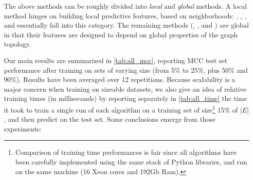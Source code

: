 The above methods can be roughly divided into \emph{local} and \emph{global} methods. A local method
hinges on building local predictive features, based on neighborhoods: \usrule{}, \uslogregp{},
\comptriads{}, and \compbayesian{} essentially fall into this category. The remaining methods
(\uslpropGsec{}, \complowrank{}, \compmaxnorm{} and \compranknodes{}) are global in that their
features are
designed to depend on global properties of the graph topology.

\iffalse
First, with label propagation (referred to as \uslprop{} in the following). We
initialize the labels vector $f_0$ to $|V'|$ random values drawn uniformly in
$[0, 1]$ and set the label of the training edges equal to their observed value.
Let the adjacency matrix of $G'$ be $A$, its diagonal degree matrix
be $D$, its diameter be $\diam{G'}$ and $P$ be the following sparse matrix $P=D^{-1}A$. This allow performing
one round of label propagation as $f_{t+1} = Pf_t$, followed by clamping the
training labels. Each round thus involves $2|E|$ multiplications and we do
$\diam{G'}$ of them\footnote{$\diam{G'}$ is a small constant, ranging from $16$
for \aut{} to $38$ for \epi{}}. With the computed labels, we can associate each
edge $\eij$ with $a_{i,j} = \nicefrac{1}{2}\left(f_{\diam{G'}}(\iout) +
f_{\diam{G'}}(\jin)\right)$.
By sorting the $a$ values of the training edges, we can find the threshold $t$
that minimizes the number of mistakes on the training set while predicting
$\yij = \sgn\left(a_{i,j} - t\right)$ in $O(|\trainset{}|\log |\trainset{}|)$
time.

Then we again associate each edge $\eij$ with $a_{i,j} = \left(1-\htr(i)\right) +
\left(1-\hun(j)\right)$ and find the $\tau$ of \eqref{eq:predictor} that minimizes the empirical
risk.  Another way to exploit those quantities is to train a Logistic Regression model where each
edge is associated with two features: $[1-\htr(i), 1-\hun(j)]$ (we call this method \uslogregp{}).
\fi

\bigskip

Our main results are summarized in \autoref{tab:all_mcc}, reporting MCC test set performance after
training on sets of varying size (from 5\% to 25\%, plus 50\% and 90\%). Results have been averaged
over 12 repetitions.
Because scalability is a major concern when training on sizeable datasets, we also give an idea of
relative training times (in milliseconds) by reporting separately in \autoref{tab:all_time} the time it took to train a single run of
each algorithm on a training set of size\footnote{Comparison of training time performances is fair
since all algorithms have been carefully implemented using the same stack of Python libraries, and
run on the same machine (16 Xeon cores and 192Gb Ram).} 15\% of $|E|$, and then predict on the test
set. Some conclusions emerge from those experiments:


